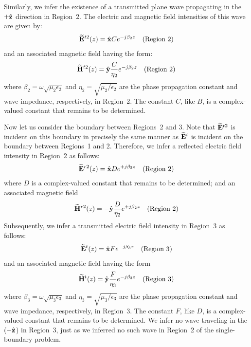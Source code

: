 Similarly, we infer the existence of a transmitted plane wave propagating in the $+\hat{\bf z}$ direction in Region~2.
The electric and magnetic field intensities of this wave are given by:
%
\begin{equation}
\widetilde{\bf E}^{t2}(z) = \hat{\bf x} C e^{-j\beta_2 z}~~~\mbox{(Region~2)}
\label{m0162_eEt}
\end{equation}
%
and an associated magnetic field having the form:
%
\begin{equation}
\widetilde{\bf H}^{t2}(z) = \hat{\bf y} \frac{C}{\eta_2} e^{-j\beta_2 z}~~~\mbox{(Region~2)}
\label{m0162_eHt}
\end{equation}
%
where $\beta_2=\omega\sqrt{\mu_2 \epsilon_2}$ and $\eta_2=\sqrt{\mu_2 / \epsilon_2}$ are the phase propagation constant and wave impedance, respectively, in Region~2.
The constant $C$, like $B$, is a complex-valued constant that remains to be determined.

Now let us consider the boundary between Regions~2 and 3.
Note that $\widetilde{\bf E}^{t2}$ is incident on this boundary in precisely the same manner as $\widetilde{\bf E}^i$ is incident on the boundary between Regions~1 and 2.
Therefore, we infer a reflected electric field intensity in Region~2 as follows: 
%
\begin{equation}
\widetilde{\bf E}^{r2}(z) = \hat{\bf x} D e^{+j\beta_2 z}~~~\mbox{(Region~2)}
\label{m0162_eEr2}
\end{equation}
%
where $D$ is a complex-valued constant that remains to be determined;
and an associated magnetic field
%
\begin{equation}
\widetilde{\bf H}^{r2}(z) = -\hat{\bf y} \frac{D}{\eta_2} e^{+j\beta_2 z}~~~\mbox{(Region~2)}
\label{m0162_eHr2}
\end{equation}
%
Subsequently, we infer a transmitted electric field intensity in Region~3 as follows: 
%
\begin{equation}
\widetilde{\bf E}^{t}(z) = \hat{\bf x} F e^{-j\beta_3 z}~~~\mbox{(Region~3)}
\label{m0162_eEt3}
\end{equation}
%
and an associated magnetic field having the form
%
\begin{equation}
\widetilde{\bf H}^{t}(z) = \hat{\bf y} \frac{F}{\eta_3} e^{-j\beta_3 z}~~~\mbox{(Region~3)}
\label{m0162_eHt3}
\end{equation}
%
where $\beta_3=\omega\sqrt{\mu_3 \epsilon_3}$ and $\eta_3=\sqrt{\mu_3 / \epsilon_3}$ are the phase propagation constant and wave impedance, respectively, in Region~3.
The constant $F$, like $D$, is a complex-valued constant that remains to be determined.
We infer no wave traveling in the ($-\hat{\bf z}$) in Region~3, just as we inferred no such wave in Region~2 of the single-boundary problem.

